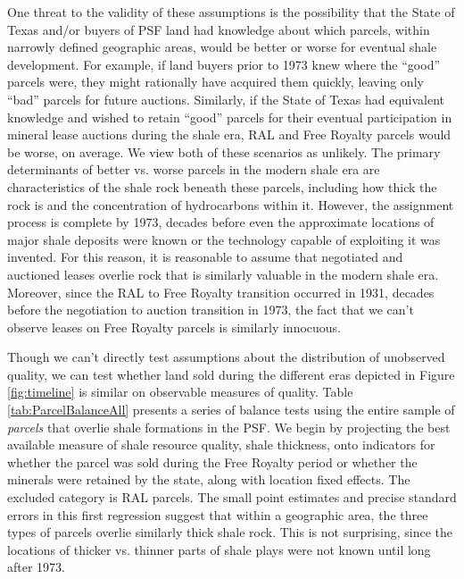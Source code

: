\documentclass[12pt]{article}
\begin{document}
One threat to the validity of these assumptions is the possibility that the State of Texas and/or buyers of PSF land had knowledge about which parcels, within narrowly defined geographic areas, would be better or worse for eventual shale development.  For example, if land buyers prior to 1973 knew where the ``good'' parcels were, they might rationally have acquired them quickly, leaving only ``bad'' parcels for future auctions.  Similarly, if the State of Texas had equivalent knowledge and wished to retain ``good'' parcels for their eventual participation in mineral lease auctions during the shale era, RAL and Free Royalty parcels would be worse, on average. We view both of these scenarios as unlikely. The primary determinants of better vs. worse parcels in the modern shale era are characteristics of the shale rock beneath these parcels, including how thick the rock is and the concentration of hydrocarbons within it.  However, the assignment process is complete by 1973, decades before even the approximate locations of major shale deposits were known or the technology capable of exploiting it was invented.  For this reason, it is reasonable to assume that negotiated and auctioned leases overlie rock that is similarly valuable in the modern shale era.  Moreover, since the RAL to Free Royalty transition occurred in 1931, decades before the negotiation to auction transition in 1973, the fact that we can't observe leases on Free Royalty parcels is similarly innocuous.

Though we can't directly test assumptions about the distribution of unobserved quality, we can test whether land sold during the different eras depicted in Figure \ref{fig:timeline} is similar on observable measures of quality. Table \ref{tab:ParcelBalanceAll} presents a series of balance tests using the entire sample of \emph{parcels} that overlie shale formations in the PSF.  We begin by projecting the best available measure of shale resource quality, shale thickness, onto indicators for whether the parcel was sold during the Free Royalty period or whether the minerals were retained by the state, along with location fixed effects.  The excluded category is RAL parcels.  The small point estimates and precise standard errors in this first regression suggest that within a geographic area, the three types of parcels overlie similarly thick shale rock. This is not surprising, since the locations of thicker vs. thinner parts of shale plays were not known until long after 1973.
\end{document}
